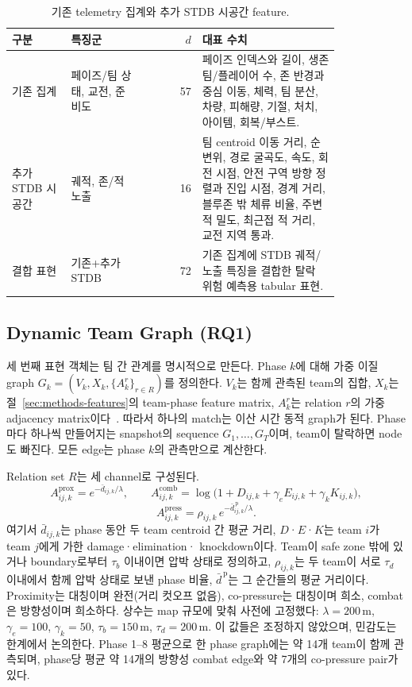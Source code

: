 \begin{table}[t]
\centering
\caption{기존 telemetry 집계와 추가 STDB 시공간 feature.}
\label{tab:feature-groups}
\scriptsize
\setlength{\tabcolsep}{2.5pt}
\begin{tabular}{p{0.18\linewidth}p{0.22\linewidth}rp{0.42\linewidth}}
\toprule
구분 & 특징군 & \(d\) & 대표 수치 \\
\midrule
기존 집계 & 페이즈/팀 상태, 교전, 준비도 & 57 &
페이즈 인덱스와 길이, 생존 팀/플레이어 수, 존 반경과 중심 이동, 체력,
팀 분산, 차량, 피해량, 기절, 처치, 아이템, 회복/부스트. \\
추가 STDB 시공간 & 궤적, 존/적 노출 & 16 &
팀 centroid 이동 거리, 순변위, 경로 굴곡도, 속도, 회전 시점, 안전 구역
방향 정렬과 진입 시점, 경계 거리, 블루존 밖 체류 비율, 주변 적 밀도,
최근접 적 거리, 교전 지역 통과. \\
결합 표현 & 기존+추가 STDB & 72 &
기존 집계에 STDB 궤적/노출 특징을 결합한 탈락 위험 예측용 tabular 표현. \\
\bottomrule
\end{tabular}
\end{table}

\subsection{Dynamic Team Graph (RQ1)}
\label{sec:team-graphs}

세 번째 표현 객체는 팀 간 관계를 명시적으로 만든다. Phase \(k\)에 대해 가중
이질 graph \(G_k=(V_k,X_k,\{A_k^r\}_{r\in R})\)를 정의한다. \(V_k\)는 함께
관측된 team의 집합, \(X_k\)는 절~\ref{sec:methods-features}의 team-phase
feature matrix, \(A_k^r\)는 relation \(r\)의 가중 adjacency
matrix이다~\cite{sanchezLengeling2021gnnIntro}. 따라서 하나의 match는 이산
시간 동적 graph가 된다. Phase마다 하나씩 만들어지는 snapshot의 sequence
\(G_1,\dots,G_T\)이며, team이 탈락하면 node도 빠진다. 모든 edge는 phase
\(k\)의 관측만으로 계산한다.

Relation set \(R\)는 세 channel로 구성된다.
\[
A^{\mathrm{prox}}_{ij,k}=e^{-\bar d_{ij,k}/\lambda},\qquad
A^{\mathrm{comb}}_{ij,k}=\log\!\big(1+D_{ij,k}+\gamma_e E_{ij,k}+\gamma_k K_{ij,k}\big),
\]
\[
A^{\mathrm{press}}_{ij,k}=\rho_{ij,k}\, e^{-\bar d^{\,\mathrm{p}}_{ij,k}/\lambda}.
\]
여기서 \(\bar d_{ij,k}\)는 phase 동안 두 team centroid 간 평균 거리,
\(D\)·\(E\)·\(K\)는 team \(i\)가 team \(j\)에게 가한 damage·elimination·
knockdown이다. Team이 safe zone 밖에 있거나 boundary로부터 \(\tau_b\) 이내이면
압박 상태로 정의하고, \(\rho_{ij,k}\)는 두 team이 서로 \(\tau_d\) 이내에서
함께 압박 상태로 보낸 phase 비율, \(\bar d^{\,\mathrm p}\)는 그 순간들의
평균 거리이다. Proximity는 대칭이며 완전(거리 컷오프 없음), co-pressure는
대칭이며 희소, combat은 방향성이며 희소하다. 상수는 map 규모에 맞춰 사전에
고정했다: \(\lambda=200\)\,m, \(\gamma_e=100\), \(\gamma_k=50\),
\(\tau_b=150\)\,m, \(\tau_d=200\)\,m. 이 값들은 조정하지 않았으며, 민감도는
한계에서 논의한다. Phase 1--8 평균으로 한 phase graph에는 약 14개 team이
함께 관측되며, phase당 평균 약 14개의 방향성 combat edge와 약 7개의
co-pressure pair가 있다.

